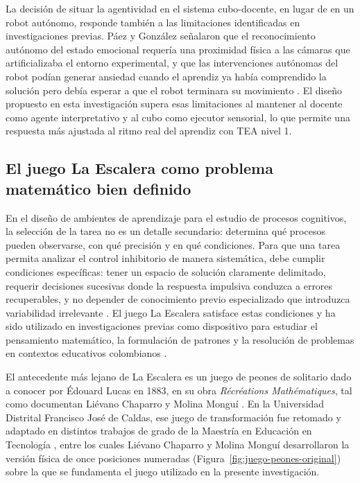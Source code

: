 \documentclass{book}
\begin{document}
La decisión de situar la agentividad en el sistema cubo-docente, 
en lugar de en un robot autónomo, responde también a las 
limitaciones identificadas en investigaciones previas. Páez y 
González señalaron que el reconocimiento autónomo del estado 
emocional requería una proximidad física a las cámaras que 
artificializaba el entorno experimental, y que las intervenciones 
autónomas del robot podían generar ansiedad cuando el aprendiz 
ya había comprendido la solución pero debía esperar a que el 
robot terminara su movimiento \cite{PaezGonzalez2022}. El diseño 
propuesto en esta investigación supera esas limitaciones al 
mantener al docente como agente interpretativo y al cubo 
como ejecutor sensorial, lo que permite una respuesta más 
ajustada al ritmo real del aprendiz con TEA nivel 1.

\subsection{El juego La Escalera como problema matemático 
bien definido}

En el diseño de ambientes de aprendizaje para el estudio de 
procesos cognitivos, la selección de la tarea no es un detalle 
secundario: determina qué procesos pueden observarse, con qué 
precisión y en qué condiciones. Para que una tarea permita 
analizar el control inhibitorio de manera sistemática, debe 
cumplir condiciones específicas: tener un espacio de solución 
claramente delimitado, requerir decisiones sucesivas donde la 
respuesta impulsiva conduzca a errores recuperables, y no 
depender de conocimiento previo especializado que introduzca 
variabilidad irrelevante \cite{PaezGonzalez2022, Diamond2013}. 
El juego La Escalera satisface estas condiciones y ha sido
utilizado en investigaciones previas como dispositivo para
estudiar el pensamiento matemático, la formulación de patrones
y la resolución de problemas en contextos educativos colombianos
\cite{Cardenas2017, RodriguezLopez2017, Natalia2017}.

El antecedente más lejano de La Escalera es un juego de peones
de solitario dado a conocer por Édouard Lucas en 1883, en su
obra \textit{Récréations Mathématiques}, tal como documentan
Liévano Chaparro y Molina Monguí \citep{LievanoMolina2022}.
En la Universidad Distrital Francisco José de Caldas, ese
juego de transformación fue retomado y adaptado en distintos
trabajos de grado de la Maestría en Educación en Tecnología
\cite{Cardenas2017, RodriguezLopez2017, Natalia2017,
LievanoMolina2022}, entre los cuales Liévano Chaparro y Molina
Monguí desarrollaron la versión física de once posiciones
numeradas (Figura~\ref{fig:juego-peones-original}) sobre la que
se fundamenta el juego utilizado en la presente investigación.
\end{document}
